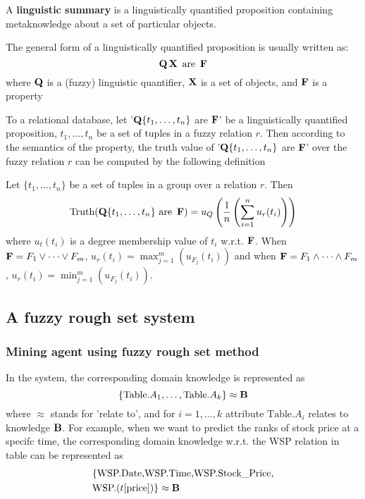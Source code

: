 \documentclass[11pt]{article}
\def \Truth {\text{Truth}}
\def \Table {\text{Table}}
\begin{document}
A \textbf{linguistic summary} is a linguistically quantified proposition containing
metaknowledge about a set of particular objects.

The general form of a linguistically quantified proposition is usually
written as:
\begin{equation*}
\operatorname{\textbf{Q}}\operatorname{\textbf{X}}\text{ are }\operatorname{\textbf{F}}
\end{equation*}
where \(\operatorname{\textbf{Q}}\) is a (fuzzy) linguistic quantifier, \(\operatorname{\textbf{X}}\) is a set of
objects, and \(\operatorname{\textbf{F}}\) is a property

To a relational database, let '\(\operatorname{\textbf{Q}}\{t_1,\dots,t_n\}\) are \(\operatorname{\textbf{F}}\)' be a
linguistically quantified proposition, \(t_1,\dots,t_n\) be a set of tuples
in  a fuzzy relation \(r\). Then according to the semantics of the property,
the truth value of '\(\operatorname{\textbf{Q}}\{t_1,\dots,t_n\}\) are \(\operatorname{\textbf{F}}\)' over the fuzzy
relation \(r\) can be computed by the following definition

\begin{definition}[]
Let \(\{t_1,\dots,t_n\}\) be a set of tuples in a group over a relation
\(r\). Then
\begin{equation*}
\Truth(\bQ\{t_1,\dots,t_n\}\text{ are }\bF)=
u_Q\left(\frac{1}{n}\left(
\sum_{i=1}^n u_r(t_i)
\right)
\right)
\end{equation*}
where \(u_t(t_i)\) is a degree membership value of \(t_i\) w.r.t. \(\operatorname{\textbf{F}}\).
When \(\operatorname{\textbf{F}}=F_1\vee\dots\vee F_m\), \(u_r(t_i)=\max_{j=1}^m(u_{F_j}(t_i))\)
and when \(\operatorname{\textbf{F}}=F_1\wedge\dots\wedge F_m\),
\(u_r(t_i)=\min_{j=1}^m(u_{F_j}(t_i))\). 
\end{definition}

\subsection{A fuzzy rough set system}
\label{sec:org19b0288}

\subsubsection{Mining agent using fuzzy rough set method}
\label{sec:org6494ac5}
In the system, the corresponding domain knowledge is represented as
\begin{equation*}
\{\Table.A_1,\dots,\Table.A_k\}\approx\bB
\end{equation*}
where \(\approx\) stands for 'relate to', and for \(i=1,\dots,k\) attribute
\(\Table.A_i\) relates to knowledge \(\operatorname{\textbf{B}}\). For example, when we want to
predict the ranks of stock price at a specifc time, the corresponding domain
knowledge w.r.t. the WSP relation in table can be represented as
\begin{align*}
&\{\text{WSP.Date,WSP.Time,WSP.Stock\_Price,}\\
&\text{WSP.}(t[\text{price}])\}\approx\operatorname{\textbf{B}}
\end{align*}
\end{document}
